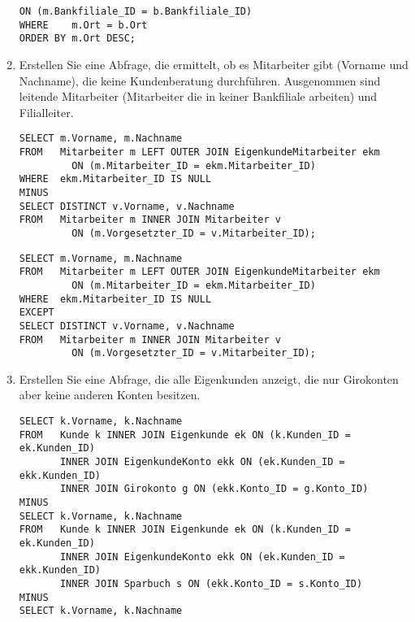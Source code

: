 \begin{enumerate}
\begin{lstlisting}[language=oracle_sql]
           ON (m.Bankfiliale_ID = b.Bankfiliale_ID)
WHERE    m.Ort = b.Ort
ORDER BY m.Ort DESC;
        \end{lstlisting}
\clearpage
        \item Erstellen Sie eine Abfrage, die ermittelt, ob es Mitarbeiter gibt
        (Vorname und Nachname), die keine Kundenberatung durchführen.
        Ausgenommen sind leitende Mitarbeiter (Mitarbeiter die in keiner
        Bankfiliale arbeiten) und Filialleiter.
        \begin{oraclesql}[\FALSE]
        \end{oraclesql}
        \begin{lstlisting}[language=oracle_sql]
SELECT m.Vorname, m.Nachname
FROM   Mitarbeiter m LEFT OUTER JOIN EigenkundeMitarbeiter ekm
         ON (m.Mitarbeiter_ID = ekm.Mitarbeiter_ID)
WHERE  ekm.Mitarbeiter_ID IS NULL
MINUS
SELECT DISTINCT v.Vorname, v.Nachname
FROM   Mitarbeiter m INNER JOIN Mitarbeiter v
         ON (m.Vorgesetzter_ID = v.Mitarbeiter_ID);
        \end{lstlisting}
        \begin{mssql}[\FALSE]
        \end{mssql}
        \begin{lstlisting}[language=ms_sql]
SELECT m.Vorname, m.Nachname
FROM   Mitarbeiter m LEFT OUTER JOIN EigenkundeMitarbeiter ekm
         ON (m.Mitarbeiter_ID = ekm.Mitarbeiter_ID)
WHERE  ekm.Mitarbeiter_ID IS NULL
EXCEPT
SELECT DISTINCT v.Vorname, v.Nachname
FROM   Mitarbeiter m INNER JOIN Mitarbeiter v
         ON (m.Vorgesetzter_ID = v.Mitarbeiter_ID);
        \end{lstlisting}
        \item Erstellen Sie eine Abfrage, die alle Eigenkunden anzeigt, die nur
        Girokonten aber keine anderen Konten besitzen.
        \begin{oraclesql}[\FALSE]
        \end{oraclesql}
        \begin{lstlisting}[language=oracle_sql]
SELECT k.Vorname, k.Nachname
FROM   Kunde k INNER JOIN Eigenkunde ek ON (k.Kunden_ID = ek.Kunden_ID)
       INNER JOIN EigenkundeKonto ekk ON (ek.Kunden_ID = ekk.Kunden_ID)
       INNER JOIN Girokonto g ON (ekk.Konto_ID = g.Konto_ID)
MINUS
SELECT k.Vorname, k.Nachname
FROM   Kunde k INNER JOIN Eigenkunde ek ON (k.Kunden_ID = ek.Kunden_ID)
       INNER JOIN EigenkundeKonto ekk ON (ek.Kunden_ID = ekk.Kunden_ID)
       INNER JOIN Sparbuch s ON (ekk.Konto_ID = s.Konto_ID)
MINUS
SELECT k.Vorname, k.Nachname

\end{lstlisting}
\end{enumerate}
